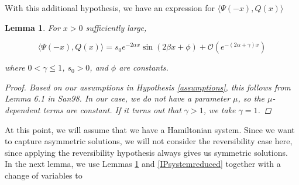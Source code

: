 \documentclass[12pt]{article}
\newtheorem{lemma}{Lemma}
\begin{document}
With this additional hypothesis, we have an expression for $\langle \Psi(-x), Q(x) \rangle$


\begin{lemma}\label{IPform}
For $x > 0$ sufficiently large,

\begin{equation}\label{IPalphabeta}
\langle \Psi(-x), Q(x) \rangle
= s_0 e^{-2 \alpha x} \sin(2 \beta x + \phi) + \mathcal{O}(e^{-(2 \alpha + \gamma) x})
\end{equation}

where $0 < \gamma \leq 1$, $s_0 > 0$, and $\phi$ are constants.
\begin{proof}
Based on our assumptions in Hypothesis \ref{assumptions}, this follows from Lemma 6.1 in San98. In our case, we do not have a parameter $\mu$, so the $\mu$-dependent terms are constant. If it turns out that $\gamma > 1$, we take $\gamma = 1$.
\end{proof}
\end{lemma}

At this point, we will assume that we have a Hamiltonian system. Since we want to capture asymmetric solutions, we will not consider the reversibility case here, since applying the reversibility hypothesis always gives us symmetric solutions.\\

In the next lemma, we use Lemmas \ref{IPform} and \ref{IPsystemreduced} together with a change of variables to 

\end{document}

